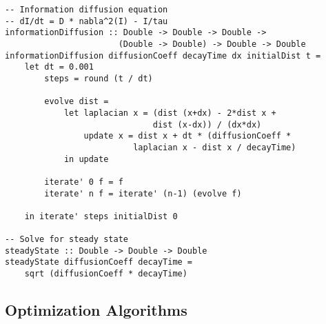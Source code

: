 \documentclass[11pt,a4paper]{article}
\theoremstyle{definition}
\begin{document}
\begin{lstlisting}
-- Information diffusion equation
-- dI/dt = D * nabla^2(I) - I/tau
informationDiffusion :: Double -> Double -> Double -> 
                       (Double -> Double) -> Double -> Double
informationDiffusion diffusionCoeff decayTime dx initialDist t =
    let dt = 0.001
        steps = round (t / dt)
        
        evolve dist = 
            let laplacian x = (dist (x+dx) - 2*dist x + 
                              dist (x-dx)) / (dx*dx)
                update x = dist x + dt * (diffusionCoeff * 
                          laplacian x - dist x / decayTime)
            in update
            
        iterate' 0 f = f
        iterate' n f = iterate' (n-1) (evolve f)
        
    in iterate' steps initialDist 0

-- Solve for steady state
steadyState :: Double -> Double -> Double
steadyState diffusionCoeff decayTime =
    sqrt (diffusionCoeff * decayTime)
\end{lstlisting}

\subsection{Optimization Algorithms}
\end{document}
